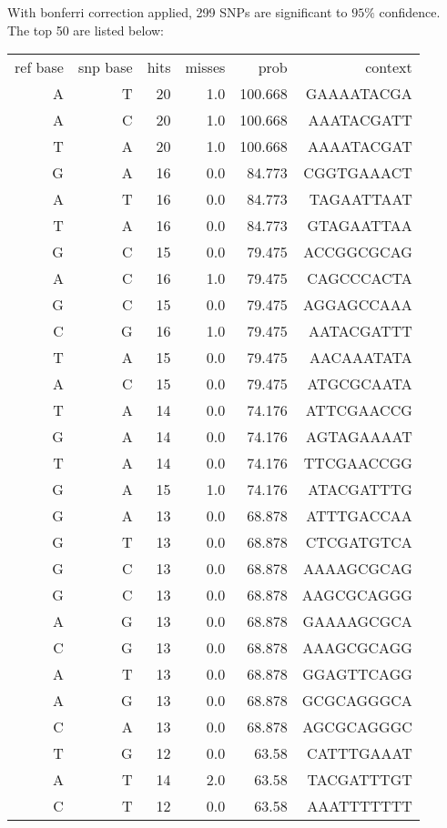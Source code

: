 \documentclass[12pt,draft,a4paper]{article}
\begin{document}
With bonferri correction applied, 299 SNPs are significant to $95\%$ confidence. The top 50 are listed below:
\begin{center}
\begin{tiny}
\begin{tabular}{rrrrrr}
ref base & snp base & hits & misses & prob & context  \\
A & T & 20 & 1.0 & 100.668 & GAAAATACGA\\
A & C & 20 & 1.0 & 100.668 & AAATACGATT\\
T & A & 20 & 1.0 & 100.668 & AAAATACGAT\\
G & A & 16 & 0.0 & 84.773 & CGGTGAAACT\\
A & T & 16 & 0.0 & 84.773 & TAGAATTAAT\\
T & A & 16 & 0.0 & 84.773 & GTAGAATTAA\\
G & C & 15 & 0.0 & 79.475 & ACCGGCGCAG\\
A & C & 16 & 1.0 & 79.475 & CAGCCCACTA\\
G & C & 15 & 0.0 & 79.475 & AGGAGCCAAA\\
C & G & 16 & 1.0 & 79.475 & AATACGATTT\\
T & A & 15 & 0.0 & 79.475 & AACAAATATA\\
A & C & 15 & 0.0 & 79.475 & ATGCGCAATA\\
T & A & 14 & 0.0 & 74.176 & ATTCGAACCG\\
G & A & 14 & 0.0 & 74.176 & AGTAGAAAAT\\
T & A & 14 & 0.0 & 74.176 & TTCGAACCGG\\
G & A & 15 & 1.0 & 74.176 & ATACGATTTG\\
G & A & 13 & 0.0 & 68.878 & ATTTGACCAA\\
G & T & 13 & 0.0 & 68.878 & CTCGATGTCA\\
G & C & 13 & 0.0 & 68.878 & AAAAGCGCAG\\
G & C & 13 & 0.0 & 68.878 & AAGCGCAGGG\\
A & G & 13 & 0.0 & 68.878 & GAAAAGCGCA\\
C & G & 13 & 0.0 & 68.878 & AAAGCGCAGG\\
A & T & 13 & 0.0 & 68.878 & GGAGTTCAGG\\
A & G & 13 & 0.0 & 68.878 & GCGCAGGGCA\\
C & A & 13 & 0.0 & 68.878 & AGCGCAGGGC\\
T & G & 12 & 0.0 & 63.58 & CATTTGAAAT\\
A & T & 14 & 2.0 & 63.58 & TACGATTTGT\\
C & T & 12 & 0.0 & 63.58 & AAATTTTTTT\\

\end{tabular}
\end{tiny}
\end{center}
\end{document}
